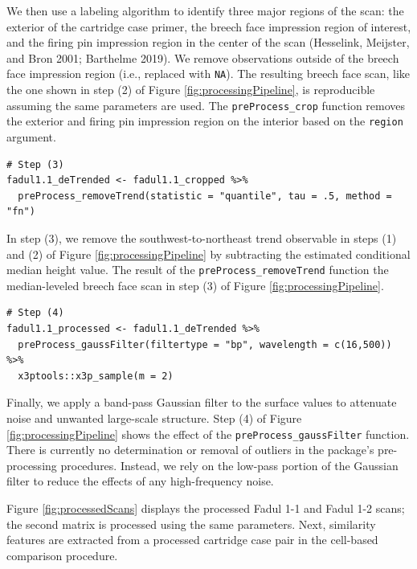 We then use a labeling algorithm to identify three major regions of the scan: the exterior of the cartridge case primer, the breech face impression region of interest, and the firing pin impression region in the center of the scan (Hesselink, Meijster, and Bron 2001; Barthelme 2019).
We remove observations outside of the breech face impression region (i.e., replaced with \texttt{NA}).
The resulting breech face scan, like the one shown in step (2) of Figure \ref{fig:processingPipeline}, is reproducible assuming the same parameters are used.
The \texttt{preProcess\_crop} function removes the exterior and firing pin impression region on the interior based on the \texttt{region} argument.

\begin{verbatim}
# Step (3)
fadul1.1_deTrended <- fadul1.1_cropped %>%
  preProcess_removeTrend(statistic = "quantile", tau = .5, method = "fn")
\end{verbatim}

In step (3), we remove the southwest-to-northeast trend observable in steps (1) and (2) of Figure \ref{fig:processingPipeline} by subtracting the estimated conditional median height value.
The result of the \texttt{preProcess\_removeTrend} function the median-leveled breech face scan in step (3) of Figure \ref{fig:processingPipeline}.

\begin{verbatim}
# Step (4)
fadul1.1_processed <- fadul1.1_deTrended %>%
  preProcess_gaussFilter(filtertype = "bp", wavelength = c(16,500)) %>%
  x3ptools::x3p_sample(m = 2)
\end{verbatim}

Finally, we apply a band-pass Gaussian filter to the surface values to attenuate noise and unwanted large-scale structure.
Step (4) of Figure \ref{fig:processingPipeline} shows the effect of the \texttt{preProcess\_gaussFilter} function.
There is currently no determination or removal of outliers in the  package's pre-processing procedures.
Instead, we rely on the low-pass portion of the Gaussian filter to reduce the effects of any high-frequency noise.

Figure \ref{fig:processedScans} displays the processed Fadul 1-1 and Fadul 1-2 scans; the second matrix is processed using the same parameters.
Next, similarity features are extracted from a processed cartridge case pair in the cell-based comparison procedure.

